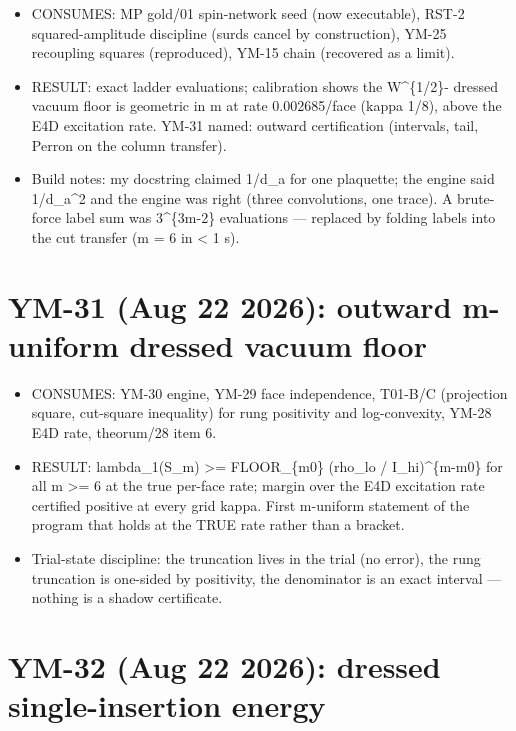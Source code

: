 \begin{itemize}
\tightlist
\item
  CONSUMES: MP gold/01 spin-network seed (now executable), RST-2
  squared-amplitude discipline (surds cancel by construction), YM-25
  recoupling squares (reproduced), YM-15 chain (recovered as a limit).
\item
  RESULT: exact ladder evaluations; calibration shows the W\^{}\{1/2\}-
  dressed vacuum floor is geometric in m at rate 0.002685/face (kappa
  1/8), above the E4D excitation rate. YM-31 named: outward
  certification (intervals, tail, Perron on the column transfer).
\item
  Build notes: my docstring claimed 1/d\_a for one plaquette; the engine
  said 1/d\_a\^{}2 and the engine was right (three convolutions, one trace).
  A brute-force label sum was 3\^{}\{3m-2\} evaluations --- replaced by
  folding labels into the cut transfer (m = 6 in \textless{} 1 s).
\end{itemize}

\hypertarget{ym-31-aug-22-2026-outward-m-uniform-dressed-vacuum-floor}{%
\section{YM-31 (Aug 22 2026): outward m-uniform dressed vacuum floor}\label{ym-31-aug-22-2026-outward-m-uniform-dressed-vacuum-floor}}

\begin{itemize}
\tightlist
\item
  CONSUMES: YM-30 engine, YM-29 face independence, T01-B/C (projection
  square, cut-square inequality) for rung positivity and log-convexity,
  YM-28 E4D rate, theorum/28 item 6.
\item
  RESULT: lambda\_1(S\_m) \textgreater= FLOOR\_\{m0\} (rho\_lo / I\_hi)\^{}\{m-m0\} for all
  m \textgreater= 6 at the true per-face rate; margin over the E4D excitation rate
  certified positive at every grid kappa. First m-uniform statement of
  the program that holds at the TRUE rate rather than a bracket.
\item
  Trial-state discipline: the truncation lives in the trial (no error),
  the rung truncation is one-sided by positivity, the denominator is an
  exact interval --- nothing is a shadow certificate.
\end{itemize}

\hypertarget{ym-32-aug-22-2026-dressed-single-insertion-energy}{%
\section{YM-32 (Aug 22 2026): dressed single-insertion energy}\label{ym-32-aug-22-2026-dressed-single-insertion-energy}}

